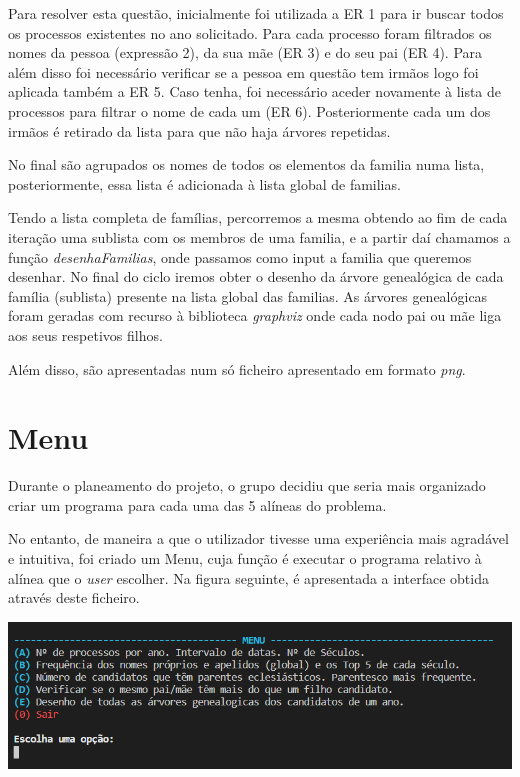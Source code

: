 \documentclass[11pt,a4paper]{report}
\begin{document}
	\qquad Para resolver esta questão, inicialmente foi utilizada a ER 1 para ir buscar todos os processos existentes no ano solicitado. Para cada processo foram filtrados os nomes da pessoa (expressão 2), da sua mãe (ER 3) e do seu pai (ER 4). Para além disso foi necessário verificar se a pessoa em questão tem irmãos logo foi aplicada também a ER 5. Caso tenha, foi necessário aceder novamente à lista de processos para filtrar o nome de cada um (ER 6). Posteriormente cada um dos irmãos é retirado da lista para que não haja árvores repetidas. \par
	\qquad No final são agrupados os nomes de todos os elementos da familia numa lista, posteriormente, essa lista é adicionada à lista global de familias.\par
	\qquad Tendo a lista completa de famílias, percorremos a mesma obtendo ao fim de cada iteração uma sublista com os membros de uma familia, e a partir daí chamamos a função \textit{desenhaFamilias}, onde passamos como input a familia que queremos desenhar. No final do ciclo iremos obter o desenho da árvore genealógica de cada família (sublista) presente na lista global das familias. As árvores genealógicas foram geradas com recurso à biblioteca \textit{graphviz} onde cada nodo pai ou mãe liga aos seus respetivos filhos.\par
	\qquad Além disso, são apresentadas num só ficheiro apresentado em formato \textit{png}.
	
	
\vspace{1cm}

	\section*{Menu}


	    \qquad Durante o planeamento do projeto, o grupo decidiu que seria mais organizado criar um programa para cada uma das 5 alíneas do problema. \par
	    \qquad No entanto, de maneira a que o utilizador tivesse uma experiência mais agradável e intuitiva, foi criado um Menu, cuja função é executar o programa relativo à alínea que o \textit{user} escolher. Na figura seguinte, é apresentada a interface obtida através deste ficheiro.

\vspace{1cm}

\begin{center}
\includegraphics[scale=0.9]{images/menu}
\end{center}
	 
\end{document}
